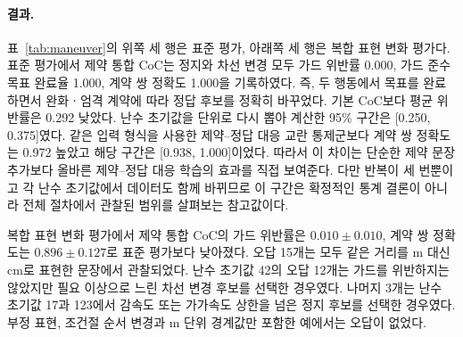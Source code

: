 \paragraph{결과.}
표~\ref{tab:maneuver}의 위쪽 세 행은 표준 평가, 아래쪽 세 행은 복합 표현 변화 평가다. 표준 평가에서 제약 통합 CoC는 정지와 차선 변경 모두 가드 위반률 0.000, 가드 준수 목표 완료율 1.000, 계약 쌍 정확도 1.000을 기록하였다. 즉, 두 행동에서 목표를 완료하면서 완화ㆍ엄격 계약에 따라 정답 후보를 정확히 바꾸었다. 기본 CoC보다 평균 위반률은 0.292 낮았다. 난수 초기값을 단위로 다시 뽑아 계산한 95\% 구간은 [0.250, 0.375]였다. 같은 입력 형식을 사용한 제약--정답 대응 교란 통제군보다 계약 쌍 정확도는 0.972 높았고 해당 구간은 [0.938, 1.000]이었다. 따라서 이 차이는 단순한 제약 문장 추가보다 올바른 제약--정답 대응 학습의 효과를 직접 보여준다. 다만 반복이 세 번뿐이고 각 난수 초기값에서 데이터도 함께 바뀌므로 이 구간은 확정적인 통계 결론이 아니라 전체 절차에서 관찰된 범위를 살펴보는 참고값이다.

복합 표현 변화 평가에서 제약 통합 CoC의 가드 위반률은 $0.010\pm0.010$, 계약 쌍 정확도는 $0.896\pm0.127$로 표준 평가보다 낮아졌다. 오답 15개는 모두 같은 거리를 m 대신 cm로 표현한 문장에서 관찰되었다. 난수 초기값 42의 오답 12개는 가드를 위반하지는 않았지만 필요 이상으로 느린 차선 변경 후보를 선택한 경우였다. 나머지 3개는 난수 초기값 17과 123에서 감속도 또는 가가속도 상한을 넘은 정지 후보를 선택한 경우였다. 부정 표현, 조건절 순서 변경과 m 단위 경계값만 포함한 예에서는 오답이 없었다. 


